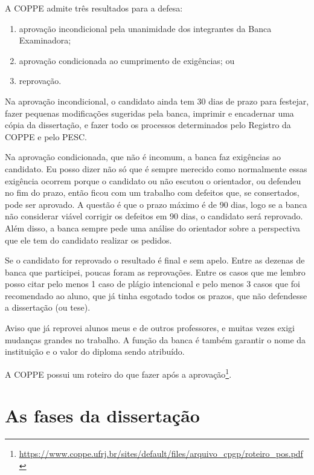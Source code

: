 \documentclass[a4paper,12pt]{report}
\begin{document}
A COPPE admite três resultados para a defesa:
\begin{enumerate}
\item aprovação incondicional pela unanimidade dos integrantes da Banca Examinadora;
\item aprovação condicionada ao cumprimento de exigências; ou
\item reprovação.
\end{enumerate}

Na aprovação incondicional, o candidato ainda tem 30 dias de prazo para festejar, fazer pequenas modificações sugeridas pela banca, imprimir e encadernar uma cópia da dissertação, e fazer todo os processos determinados pelo Registro da COPPE e pelo PESC.

Na aprovação condicionada, que não é incomum, a banca faz exigências ao candidato. Eu posso dizer não só que é sempre merecido como normalmente essas exigência ocorrem porque o candidato ou não escutou o orientador, ou defendeu no fim do prazo, então ficou com um trabalho com defeitos que, se consertados, pode ser aprovado. A questão é que o prazo máximo é de 90 dias, logo se a banca não considerar viável corrigir os defeitos em 90 dias, o candidato será reprovado. Além disso, a banca sempre pede uma análise do orientador sobre a perspectiva que ele tem do candidato realizar os pedidos.

Se o candidato for reprovado o resultado é final e sem apelo. Entre as dezenas de banca que participei, poucas foram as reprovações. Entre os casos que me lembro posso citar pelo menos 1 caso de plágio intencional e pelo menos 3 casos que foi recomendado ao aluno, que já tinha esgotado todos os prazos, que não defendesse a dissertação (ou tese).

Aviso que já reprovei alunos meus e de outros professores, e muitas vezes exigi mudanças grandes no trabalho. A função da banca é também garantir o nome da instituição e o valor do diploma sendo atribuído.

A COPPE possui um roteiro do que fazer após a aprovação\footnote{\url{https://www.coppe.ufrj.br/sites/default/files/arquivo_cpgp/roteiro_pos.pdf}}.



\chapter{As fases da dissertação}
\end{document}
